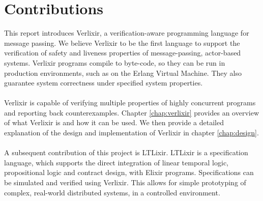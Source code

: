 \section{Contributions}
This report introduces Verlixir, a verification-aware programming language for message passing. We believe Verlixir to be the first language to support the verification of safety and liveness properties of message-passing, actor-based systems. Verlixir programs compile to byte-code, so they can be run in production environments, such as on the Erlang Virtual Machine. They also guarantee system correctness under specified system properties.
\\ \\
Verlixir is capable of verifying multiple properties of highly concurrent programs and reporting back counterexamples. Chapter \ref{chap:verlixir} provides an overview of what Verlixir is and how it can be used. We then provide a detailed explanation of the design and implementation of Verlixir in chapter \ref{chap:design}.
\\ \\
A subsequent contribution of this project is LTLixir. LTLixir is a specification language, which supports the direct integration of linear temporal logic, propositional logic and contract design, with Elixir programs. Specifications can be simulated and verified using Verlixir. This allows for simple prototyping of complex, real-world distributed systems, in a controlled environment.